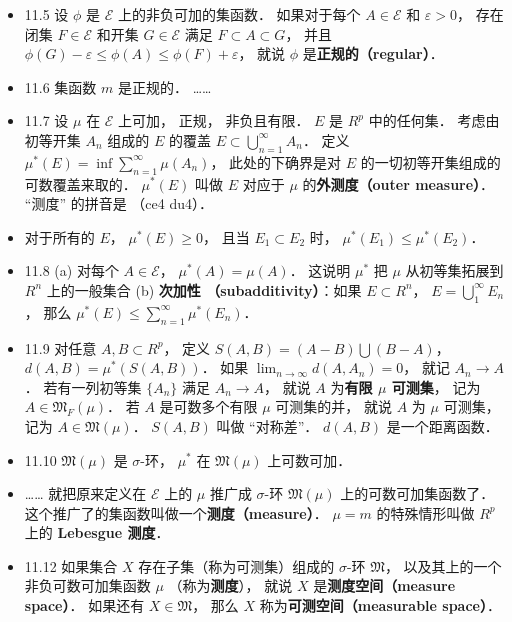 \begin{itemize}
\item 11.5 设 $\phi$ 是 $\mathscr E$ 上的非负可加的集函数． 如果对于每个 $A\in \mathscr E$ 和 $\varepsilon>0$， 存在闭集 $F\in \mathscr E$ 和开集 $G\in\mathscr E$ 满足 $F\subset A\subset G$， 并且 $\phi(G)-\varepsilon \leqslant \phi(A) \leqslant \phi(F) + \varepsilon$， 就说 $\phi$ 是\textbf{正规的（regular）}．

\item 11.6 集函数 $m$ 是正规的． ……

\item 11.7 设 $\mu$ 在 $\mathscr E$ 上可加， 正规， 非负且有限． $E$ 是 $R^p$ 中的任何集． 考虑由初等开集 $A_n$ 组成的 $E$ 的覆盖 $E\subset \bigcup_{n=1}^\infty A_n$． 定义 $\mu^*(E) = \inf \sum_{n=1}^\infty \mu(A_n)$， 此处的下确界是对 $E$ 的一切初等开集组成的可数覆盖来取的． $\mu^*(E)$ 叫做 $E$ 对应于 $\mu$ 的\textbf{外测度（outer measure）}． “测度” 的拼音是 （ce4 du4）．

\item 对于所有的 $E$， $\mu^*(E)\geqslant 0$， 且当 $E_1\subset E_2$ 时， $\mu^*(E_1) \leqslant \mu^*(E_2)$．

\item 11.8 (a) 对每个 $A\in \mathscr E$， $\mu^*(A)=\mu(A)$． 这说明 $\mu^*$ 把 $\mu$ 从初等集拓展到 $R^n$ 上的一般集合 (b) \textbf{次加性 （subadditivity）}：如果 $E\subset R^n$， $E=\bigcup_1^\infty E_n$， 那么 $\mu^*(E)\leqslant \sum_{n=1}^\infty \mu^*(E_n)$．

\item 11.9 对任意 $A,B \subset R^p$， 定义 $S(A,B)=(A-B)\bigcup (B-A)$， $d(A,B)=\mu^*(S(A,B))$． 如果 $\lim_{n\to\infty} d(A,A_n)=0$， 就记 $A_n\to A$． 若有一列初等集 $\{A_n\}$ 满足 $A_n\to A$， 就说 $A$ 为\textbf{有限 $\mu$ 可测集}， 记为 $A\in \mathfrak M_F(\mu)$． 若 $A$ 是可数多个有限 $\mu$ 可测集的并， 就说 $A$ 为 $\mu$ 可测集， 记为 $A\in \mathfrak M(\mu)$． $S(A,B)$ 叫做 “对称差”． $d(A,B)$ 是一个距离函数．

\item 11.10 $\mathfrak M(\mu)$ 是 $\sigma$-环， $\mu^*$ 在 $\mathfrak M(\mu)$ 上可数可加．

\item …… 就把原来定义在 $\mathscr E$ 上的 $\mu$ 推广成 $\sigma$-环 $\mathfrak M(\mu)$ 上的可数可加集函数了． 这个推广了的集函数叫做一个\textbf{测度（measure）}． $\mu=m$ 的特殊情形叫做 $R^p$ 上的 \textbf{Lebesgue 测度}．

\item 11.12 如果集合 $X$ 存在子集（称为可测集）组成的 $\sigma$-环 $\mathfrak M$， 以及其上的一个非负可数可加集函数 $\mu$ （称为\textbf{测度}）， 就说 $X$ 是\textbf{测度空间（measure space）}． 如果还有 $X\in \mathfrak M$， 那么 $X$ 称为\textbf{可测空间（measurable space）}．


\end{itemize}
